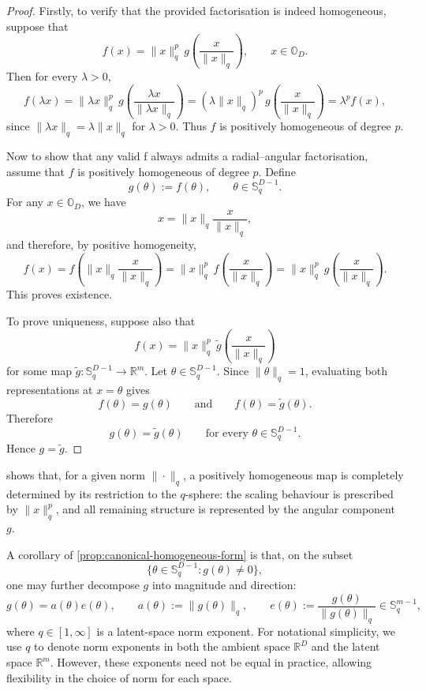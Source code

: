 \begin{proof}
Firstly, to verify that the provided factorisation is indeed homogeneous, suppose that
\[
f(x) = \|x\|_{q}^p\, g\!\left(\frac{x}{\|x\|_{q}}\right),
\qquad x \in \mathbb{O}_D.
\]
Then for every \(\lambda > 0\),
\[
f(\lambda x)
=
\|\lambda x\|_{q}^p\, g\!\left(\frac{\lambda x}{\|\lambda x\|_{q}}\right)
=
(\lambda \|x\|_{q})^p\, g\!\left(\frac{x}{\|x\|_{q}}\right)
=
\lambda^p f(x),
\]
since \(\|\lambda x\|_{q} = \lambda \|x\|_{q}\) for \(\lambda > 0\). Thus \(f\) is positively homogeneous of degree \(p\).

Now to show that any valid f always admits a radial--angular factorisation, assume that \(f\) is positively homogeneous of degree \(p\). Define
\[
g(\theta) := f(\theta),
\qquad \theta \in \mathbb{S}^{D-1}_{q}.
\]
For any \(x \in \mathbb{O}_D\), we have
\[
x = \|x\|_{q} \frac{x}{\|x\|_{q}},
\]
and therefore, by positive homogeneity,
\[
f(x)
=
f\!\left(\|x\|_{q} \frac{x}{\|x\|_{q}}\right)
=
\|x\|_{q}^p\, f\!\left(\frac{x}{\|x\|_{q}}\right)
=
\|x\|_{q}^p\, g\!\left(\frac{x}{\|x\|_{q}}\right).
\]
This proves existence.

To prove uniqueness, suppose also that
\[
f(x) = \|x\|_{q}^p\, \tilde g\!\left(\frac{x}{\|x\|_{q}}\right)
\]
for some map \(\tilde g : \mathbb{S}^{D-1}_{q} \to \mathbb{R}^m\). Let
\(\theta \in \mathbb{S}^{D-1}_{q}\). Since \(\|\theta\|_{q} = 1\), evaluating both
representations at \(x=\theta\) gives
\[
f(\theta)=g(\theta)
\qquad\text{and}\qquad
f(\theta)=\tilde g(\theta).
\]
Therefore
\[
g(\theta)=\tilde g(\theta)
\qquad
\text{for every } \theta \in \mathbb{S}^{D-1}_{q}.
\]
Hence \(g=\tilde g\).
\end{proof}

\begin{remark}
 shows that, for a given norm
\(\|\cdot\|_{q}\), a positively homogeneous map is completely determined by its
restriction to the \(q\)-sphere: the scaling behaviour is prescribed by \(\|x\|_{q}^p\), and all remaining structure is represented by the angular component \(g\).
\end{remark}

A corollary of \ref{prop:canonical-homogeneous-form} is that, on the subset
\[
\{\theta \in \mathbb{S}^{D-1}_{q} : g(\theta) \neq 0\},
\]
one may further decompose \(g\) into magnitude and direction:
\[
g(\theta) = a(\theta)e(\theta),
\qquad
a(\theta) := \|g(\theta)\|_{q},
\qquad
e(\theta) := \frac{g(\theta)}{\|g(\theta)\|_{q}} \in \mathbb{S}^{m-1}_{q},
\]
where \(q \in [1,\infty]\) is a latent-space norm exponent. For notational simplicity, we use \(q\) to denote norm exponents in both the ambient space \(\mathbb{R}^D\) and the latent space \(\mathbb{R}^m\). However, these exponents need not be equal in practice, allowing flexibility in the choice of norm for each space.

